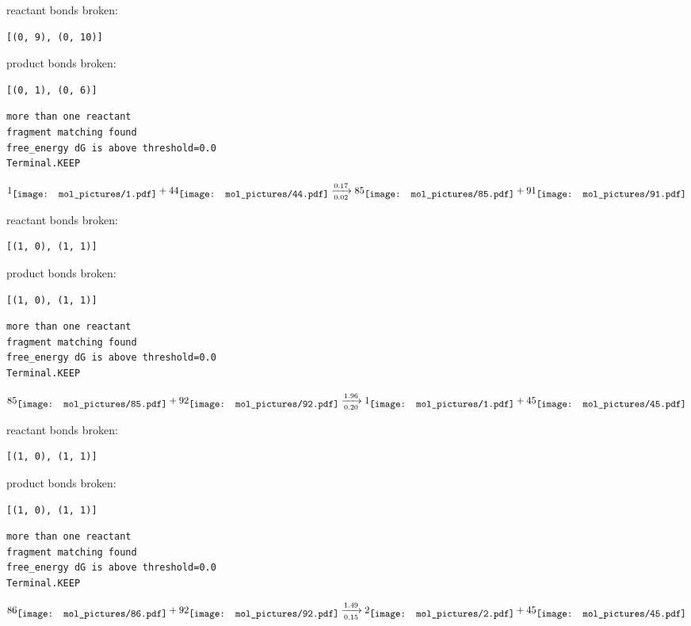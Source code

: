 \documentclass{article}
\begin{document}
reactant bonds broken:\begin{verbatim}
[(0, 9), (0, 10)]
\end{verbatim}
product bonds broken:\begin{verbatim}
[(0, 1), (0, 6)]
\end{verbatim}




\vspace{1cm}
\begin{verbatim}
more than one reactant
fragment matching found
free_energy dG is above threshold=0.0
Terminal.KEEP
\end{verbatim}
$$
1
\raisebox{-.5\height}{\texttt{[image: mol\_pictures/1.pdf]}}
+
44
\raisebox{-.5\height}{\texttt{[image: mol\_pictures/44.pdf]}}
\xrightarrow[0.02]{0.17}
85
\raisebox{-.5\height}{\texttt{[image: mol\_pictures/85.pdf]}}
+
91
\raisebox{-.5\height}{\texttt{[image: mol\_pictures/91.pdf]}}
$$


reactant bonds broken:\begin{verbatim}
[(1, 0), (1, 1)]
\end{verbatim}
product bonds broken:\begin{verbatim}
[(1, 0), (1, 1)]
\end{verbatim}




\vspace{1cm}
\begin{verbatim}
more than one reactant
fragment matching found
free_energy dG is above threshold=0.0
Terminal.KEEP
\end{verbatim}
$$
85
\raisebox{-.5\height}{\texttt{[image: mol\_pictures/85.pdf]}}
+
92
\raisebox{-.5\height}{\texttt{[image: mol\_pictures/92.pdf]}}
\xrightarrow[0.20]{1.96}
1
\raisebox{-.5\height}{\texttt{[image: mol\_pictures/1.pdf]}}
+
45
\raisebox{-.5\height}{\texttt{[image: mol\_pictures/45.pdf]}}
$$


reactant bonds broken:\begin{verbatim}
[(1, 0), (1, 1)]
\end{verbatim}
product bonds broken:\begin{verbatim}
[(1, 0), (1, 1)]
\end{verbatim}




\vspace{1cm}
\begin{verbatim}
more than one reactant
fragment matching found
free_energy dG is above threshold=0.0
Terminal.KEEP
\end{verbatim}
$$
86
\raisebox{-.5\height}{\texttt{[image: mol\_pictures/86.pdf]}}
+
92
\raisebox{-.5\height}{\texttt{[image: mol\_pictures/92.pdf]}}
\xrightarrow[0.15]{1.49}
2
\raisebox{-.5\height}{\texttt{[image: mol\_pictures/2.pdf]}}
+
45
\raisebox{-.5\height}{\texttt{[image: mol\_pictures/45.pdf]}}
$$
\end{document}
